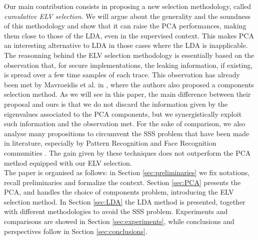  Our main contribution consists in proposing a new selection methodology, called {\em cumulative ELV selection}. We will argue about the generality and the soundness of this methodology and show that it can raise the PCA performances, making them close to those of the LDA, even in the supervised context. This makes PCA an interesting alternative to LDA in those cases where the LDA is inapplicable. The reasonning behind the ELV selection methodology is essentially based on the observation that, for secure implementations, the leaking information, if existing, is spread over a few time samples of each trace. This observation has already been met by Mavroeidis et al. in \cite{SCAclassProbl}, where the authors  also proposed a components selection method. As we will see in this paper, the main difference between their proposal and ours is that we do not discard the information given by the eigenvalues associated to the PCA components, but we synergistically exploit such information and the observation met. For the sake of comparison, we also analyse many propositions to circumvent the SSS problem that have been made in literature, especially by Pattern Recognition and Face Recognition communities \cite{eigenfaces,Chen2000,huang,Yu01adirect}. The gain given by these techniques does not outperform the PCA method equipped with our ELV selection.\\

The paper is organised as follows: in Section \ref{sec:preliminaries} we fix notations, recall preliminaries and formalize the context. Section \ref{sec:PCA} presents the PCA, and handles the choice of components problem, introducing the  ELV selection method. In Section \ref{sec:LDA} the LDA method is presented, together with different methodologies to avoid the SSS problem. Experiments and comparisons are showed in Section \ref{sec:experiments}, while conclusions and perspectives follow in Section \ref{sec:conclusions}. 